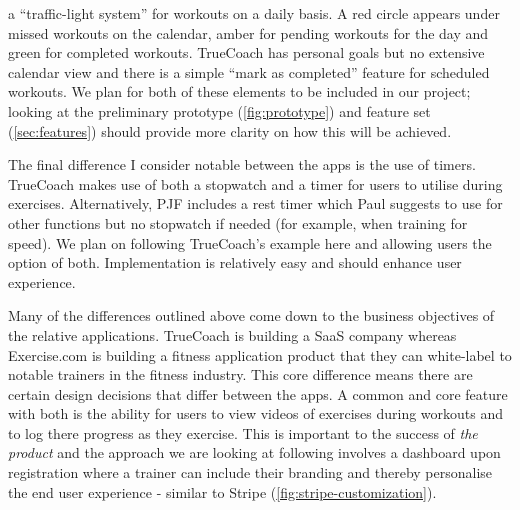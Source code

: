 a ``traffic-light system'' for workouts on a daily basis. A red circle appears under missed workouts
on the calendar, amber for pending workouts for the day and green for completed workouts. TrueCoach
has personal goals but no extensive calendar view and there is a simple ``mark as completed'' feature
for scheduled workouts. We plan for both of these elements
to be included in our project; looking at the preliminary
prototype (\cref{fig:prototype}) and feature set (\cref{sec:features}) should provide more clarity on how this will be achieved.
\par
The final difference I consider notable between the apps is the use of timers. TrueCoach makes use of both
a stopwatch and a timer for users to utilise during exercises. Alternatively, PJF includes a rest timer
which Paul suggests to use for other functions but no stopwatch if needed (for example, when training for speed).
We plan on following TrueCoach's example here and allowing users the option of both. Implementation is relatively easy
 and should enhance user experience.
\par 
Many of the differences outlined above come down to the business objectives of the relative applications. TrueCoach is building a
SaaS company whereas Exercise.com is building a fitness application product that they can
white-label to notable trainers in the fitness industry. This core difference means there are certain
design decisions that differ between the apps. A common and core feature with both is the 
ability for users to view videos of exercises during workouts and to log there progress as they exercise.
This is important to the success of \textit{the product} and the approach we are looking at following involves
a dashboard upon registration where a trainer can include their branding and thereby personalise the end user
experience - similar to Stripe (\cref{fig:stripe-customization}).
\pagebreak

